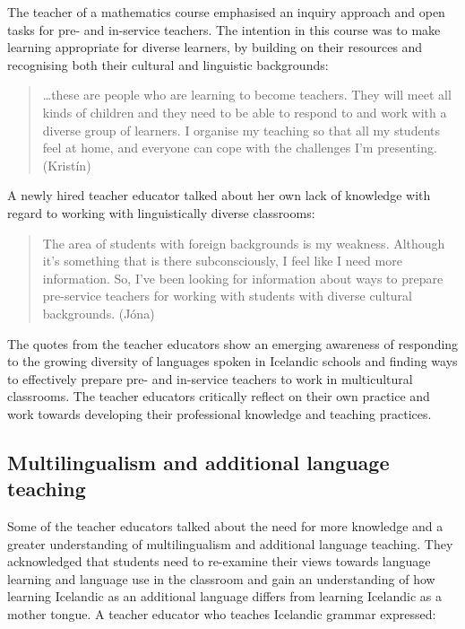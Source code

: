 \documentclass[output=paper]{langscibook}
\begin{document}
The teacher of a mathematics course emphasised an inquiry approach and open tasks for pre- and in-service teachers. {The intention in this course was to make learning appropriate for diverse learners, by building on their resources and recognising both their cultural and linguistic backgrounds:}

\begin{quote}
…these are people who are learning to become teachers. They will meet all kinds of children and they need to be able to respond to and work with a diverse group of learners. I organise my teaching so that all my students feel at home, and everyone can cope with the challenges I’m presenting. (Kristín)
\end{quote}

A newly hired teacher educator talked about her own lack of knowledge with regard to working with linguistically diverse classrooms:

\begin{quote}
\sloppy
The area of students with foreign backgrounds is my weakness. Although it’s something that is there subconsciously, I feel like I need more information. So, I’ve been looking for information about ways to prepare pre-service teachers for working with students with diverse cultural backgrounds. (Jóna)
\end{quote}

The quotes from the teacher educators show an emerging awareness of responding to the growing diversity of languages spoken in Icelandic schools and finding ways to effectively prepare pre- and in-service teachers to work in multicultural classrooms. The teacher educators {critically reflect on their own practice and work towards developing their professional knowledge and teaching practices.}

\subsection{Multilingualism and additional language teaching}

Some of the teacher educators talked about the need for more knowledge and a greater understanding of multilingualism and additional language teaching. They acknowledged that students need to re-examine their views towards language learning and language use in the classroom and gain an understanding of how learning Icelandic as an additional language differs from learning Icelandic as a mother tongue. A teacher educator who teaches Icelandic grammar expressed: 
\end{document}
